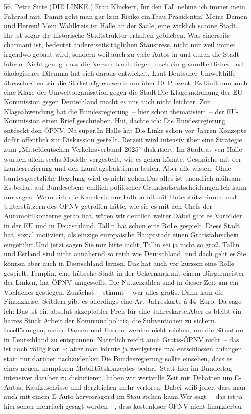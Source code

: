 \documentclass{article}
\begin{document}
	56. Petra Sitte (DIE LINKE.) Frau Kluckert, für den Fall nehme ich immer mein Fahrrad mit. Damit geht man gar kein Risiko ein.Frau Präsidentin! Meine Damen und Herren! Mein Wahlkreis ist Halle an der Saale, eine wirklich schöne Stadt. Ihr ist sogar die historische Stadtstruktur erhalten geblieben. Was einerseits charmant ist, bedeutet andererseits täglichen Staustress, nicht nur weil immer irgendwo gebaut wird, sondern weil auch zu viele Autos in und durch die Stadt fahren. Nicht genug, dass die Nerven blank liegen, auch ein gesundheitliches und ökologisches Dilemma hat sich daraus entwickelt. Laut Deutscher Umwelthilfe überschreiten wir die Stickstoffgrenzwerte um über 10 Prozent. Es läuft nun auch eine Klage der Umweltorganisation gegen die Stadt.Die Klageandrohung der EU-Kommission gegen Deutschland macht es uns auch nicht leichter. Zur Klageabwendung hat die Bundesregierung – hier schon thematisiert – der EU-Kommission einen Brief geschrieben. Hui, dachte ich: Die Bundesregierung entdeckt den ÖPNV. Na super.In Halle hat Die Linke schon vor Jahren Konzepte dafür öffentlich zur Diskussion gestellt. Derzeit wird intensiv über eine Strategie zum „Mitteldeutschen Verkehrsverbund 2025“ diskutiert. Im Stadtrat von Halle wurden allein sechs Modelle vorgestellt, wie es gehen könnte. Gespräche mit der Landesregierung und den Landtagsfraktionen laufen. Aber alle wissen: Ohne bundesgesetzliche Regelung wird es nicht gehen.Das alles ist unendlich mühsam. Es bedarf auf Bundesebene endlich politischer Grundsatzentscheidungen.Ich kann nur sagen: Wenn sich die Kanzlerin nur halb so oft mit Unterstützerinnen und Unterstützern des ÖPNV getroffen hätte, wie sie es mit den Chefs der Automobilkonzerne getan hat, wären wir deutlich weiter.Dabei gibt es Vorbilder in der EU und in Deutschland. Tallin hat schon eine Rolle gespielt. Diese Stadt hat, sozial motiviert, als einzige europäische Hauptstadt einen Gratisfahrschein eingeführt.Und jetzt sagen Sie mir bitte nicht, Tallin sei ja nicht so groß. Tallin und Estland sind nicht annähernd so reich wie Deutschland, und doch geht es.Sie können aber auch in Deutschland lernen. Das hat auch vor kurzem eine Rolle gespielt. Templin, eine hübsche Stadt in der Uckermark,mit einem Bürgermeister der Linken, hat ÖPNV umgestellt. Die Nutzerzahlen sind in dieser Zeit um ein Vielfaches gestiegen. Zunächst – stimmt – war alles gratis. Dann kam die Finanzkrise. Seitdem gibt es allerdings eine Art Jahreskarte à 44 Euro. Da sage ich: Das ist ein absolut akzeptabler Preis für eine Jahreskarte.Aber es bleibt ein hartes Stück Arbeit der Kommunalpolitik, die Subventionen zu sichern. Insellösungen, meine Damen und Herren, werden nicht reichen, um die Situation in Deutschland zu entspannen. Natürlich reicht auch Gratis-ÖPNV nicht – das ist doch völlig klar –; aber man könnte ja wenigstens mal entschlossen anfangen, statt nur darüber nachzudenken.Die Bundesregierung sollte einsehen, dass es eines neuen, komplexen Mobilitätskonzeptes bedarf. Statt hier im Bundestag intensiver darüber zu diskutieren, haben wir wertvolle Zeit mit Debatten um E-Autos, Kaufzuschüsse und dergleichen mehr verloren. Dabei weiß jeder, dass man auch mit einem E‑Auto hervorragend im Stau stehen kann.Wer sagt – das ist ja hier schon mehrfach gesagt worden –, dass kostenloser ÖPNV nicht finanzierbar 
\end{document}
